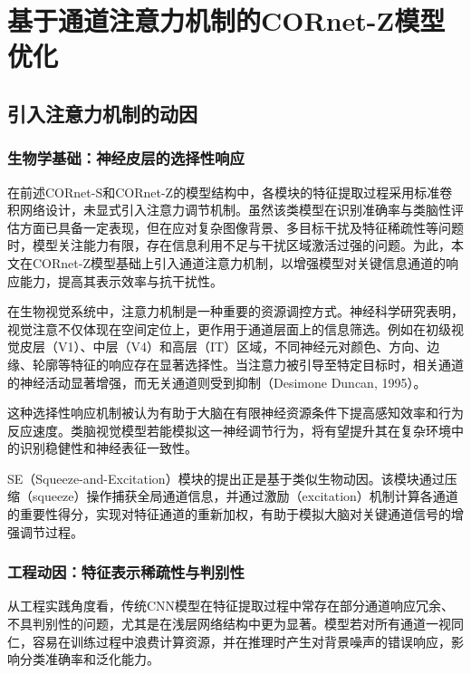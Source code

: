 \chapter{基于通道注意力机制的CORnet-Z模型优化}

\section{引入注意力机制的动因}

\subsection{生物学基础：神经皮层的选择性响应}

在前述CORnet-S和CORnet-Z的模型结构中，各模块的特征提取过程采用标准卷积网络设计，未显式引入注意力调节机制。虽然该类模型在识别准确率与类脑性评估方面已具备一定表现，但在应对复杂图像背景、多目标干扰及特征稀疏性等问题时，模型关注能力有限，存在信息利用不足与干扰区域激活过强的问题。为此，本文在CORnet-Z模型基础上引入通道注意力机制，以增强模型对关键信息通道的响应能力，提高其表示效率与抗干扰性。

在生物视觉系统中，注意力机制是一种重要的资源调控方式。神经科学研究表明，视觉注意不仅体现在空间定位上，更作用于通道层面上的信息筛选。例如在初级视觉皮层（V1）、中层（V4）和高层（IT）区域，不同神经元对颜色、方向、边缘、轮廓等特征的响应存在显著选择性。当注意力被引导至特定目标时，相关通道的神经活动显著增强，而无关通道则受到抑制（Desimone Duncan, 1995）。

这种选择性响应机制被认为有助于大脑在有限神经资源条件下提高感知效率和行为反应速度。类脑视觉模型若能模拟这一神经调节行为，将有望提升其在复杂环境中的识别稳健性和神经表征一致性。

SE（Squeeze-and-Excitation）模块的提出正是基于类似生物动因。该模块通过压缩（squeeze）操作捕获全局通道信息，并通过激励（excitation）机制计算各通道的重要性得分，实现对特征通道的重新加权，有助于模拟大脑对关键通道信号的增强调节过程。

\subsection{工程动因：特征表示稀疏性与判别性}

从工程实践角度看，传统CNN模型在特征提取过程中常存在部分通道响应冗余、不具判别性的问题，尤其是在浅层网络结构中更为显著。模型若对所有通道一视同仁，容易在训练过程中浪费计算资源，并在推理时产生对背景噪声的错误响应，影响分类准确率和泛化能力。

